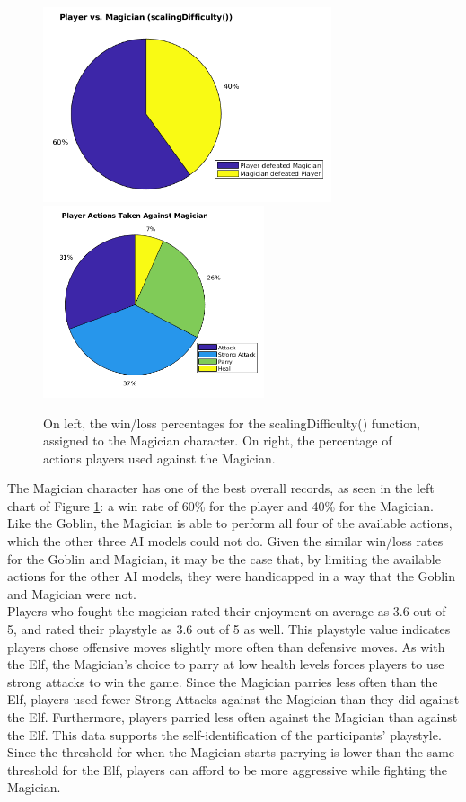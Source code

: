 \begin{figure}[H]
  \centering
  \includegraphics[width=8.5cm]{figures/magicianWins.png}
  \includegraphics[width=6.5cm]{figures/actionsMagician.png}
  \caption{On left, the win/loss percentages for the scalingDifficulty() function, assigned to the Magician character. On right, the percentage of actions players used against the Magician.}
  \label{fig:pieMagician}
\end{figure}

The Magician character has one of the best overall records, as seen in the left chart of Figure \ref{fig:pieMagician}: a win rate of 60\% for the player and 40\% for the Magician. Like the Goblin, the Magician is able to perform all four of the available actions, which the other three AI models could not do. Given the similar win/loss rates for the Goblin and Magician, it may be the case that, by limiting the available actions for the other AI models, they were handicapped in a way that the Goblin and Magician were not.\\

Players who fought the magician rated their enjoyment on average as 3.6 out of 5, and rated their playstyle as 3.6 out of 5 as well. This playstyle value indicates players chose offensive moves slightly more often than defensive moves. As with the Elf, the Magician's choice to parry at low health levels forces players to use strong attacks to win the game. Since the Magician parries less often than the Elf, players used fewer Strong Attacks against the Magician than they did against the Elf. Furthermore, players parried less often against the Magician than against the Elf. This data supports the self-identification of the participants' playstyle. Since the threshold for when the Magician starts parrying is lower than the same threshold for the Elf, players can afford to be more aggressive while fighting the Magician. 

